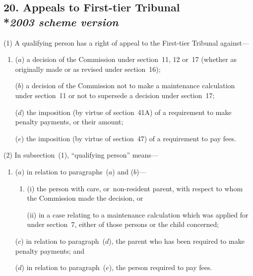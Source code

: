 \documentclass[12pt,a4paper]{article}
\begin{document}
\subsection[20. Appeals to 
First-tier Tribunal  %
--- \emph{2003 scheme version}]{20. Appeals to 
First-tier Tribunal%
\\*\emph{2003 scheme version}}

(1) A qualifying person has a right of appeal to 
the First-tier Tribunal  %
against—
\begin{enumerate}\item[]
($a$) a decision of the 
Commission  %
under section~11, 12 or~17 (whether as originally made or as revised under section~16);

($b$) a decision of the 
Commission  %
not to make a maintenance calculation under section~11 or not to supersede a decision under section~17;


($d$) the imposition (by virtue of section~41A) of a requirement to make penalty payments, or their amount;

($e$) the imposition (by virtue of section~47) of a requirement to pay fees.
\end{enumerate}

(2) In subsection~(1), “qualifying person” means—
\begin{enumerate}\item[]
($a$) in relation to paragraphs~($a$)  and ($b$)—
\begin{enumerate}\item[]
(i) the person with care, or~non-resident parent, with respect to whom the 
Commission  %
made the decision, or

(ii) in a case relating to a maintenance calculation which was applied for under section~7, either of those persons or the child concerned;
\end{enumerate}


($c$) in relation to paragraph~($d$), the parent who has been required to make penalty payments; and

($d$) in relation to paragraph~($e$), the person required to pay fees.
\end{enumerate}
\end{document}

